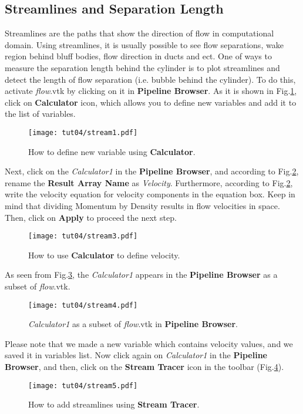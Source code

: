 \subsection{Streamlines and Separation Length}
Streamlines are the paths that show the direction of flow in computational domain. Using streamlines, it is usually possible to see flow separations, wake region behind bluff bodies, flow direction in ducts and ect. One of ways to measure the separation length behind the cylinder is to plot streamlines and detect the length of flow separation (i.e. bubble behind the cylinder). To do this, activate \textit{flow}.vtk by clicking on it in \textbf{Pipeline Browser}. As it is shown in Fig.\ref{fig4:stream1_4}, click on \textbf{Calculator} icon, which allows you to define new variables and add it to the list of variables.
\begin{figure}[htbp]
    \centering
    \texttt{[image: tut04/stream1.pdf]}
    \caption{How to define new variable using \textbf{Calculator}.}
    \label{fig4:stream1_4}
\end{figure}
Next, click on the \textit{Calculator1} in the \textbf{Pipeline Browser}, and according to Fig.\ref{fig4:stream3_4}, rename the \textbf{Result Array Name} as \textit{Velocity}. Furthermore, according to Fig.\ref{fig4:stream3_4}, write the velocity equation for velocity components in the equation box. Keep in mind that dividing Momentum by Density results in flow velocities in space. Then, click on \textbf{Apply} to proceed the next step.
\begin{figure}[htbp]
    \centering
    \texttt{[image: tut04/stream3.pdf]}
    \caption{How to use \textbf{Calculator} to define velocity.}
    \label{fig4:stream3_4}
\end{figure}
As seen from Fig.\ref{fig4:stream4_4}, the \textit{Calculator1} appears in the \textbf{Pipeline Browser} as a subset of \textit{flow}.vtk.
\begin{figure}[htbp]
    \centering
    \texttt{[image: tut04/stream4.pdf]}
    \caption{\textit{Calculator1} as a subset of \textit{flow}.vtk in \textbf{Pipeline Browser}.}
    \label{fig4:stream4_4}
\end{figure}
Please note that we made a new variable which contains velocity values, and we saved it in variables list. Now click again on \textit{Calculator1} in the \textbf{Pipeline Browser}, and then, click on the \textbf{Stream Tracer} icon in the toolbar (Fig.\ref{fig4:stream5_4}).
\begin{figure}[htbp]
    \centering
    \texttt{[image: tut04/stream5.pdf]}
    \caption{How to add streamlines using \textbf{Stream Tracer}.}
    \label{fig4:stream5_4}
\end{figure}
